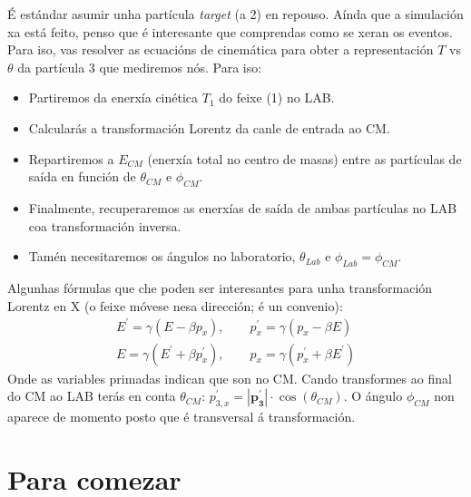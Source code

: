 \documentclass[11pt, a4paper]{article}
\newcommand{\vect}[1]{\boldsymbol{#1}}
\begin{document}
É estándar asumir unha partícula \textit{target} (a 2) en repouso. Aínda que a simulación xa está feito, penso que é interesante que comprendas como se xeran os eventos. Para iso, vas resolver as ecuacións de cinemática para obter a representación $T$ vs $\theta$ da partícula 3 que mediremos nós. Para iso:
\begin{itemize}
    \item Partiremos da enerxía cinética $T_1$ do feixe (1) no LAB.
    \item Calcularás a transformación Lorentz da canle de entrada ao CM.
    \item Repartiremos a $E_{CM}$ (enerxía total no centro de masas) entre as partículas de saída en función de $\theta_{CM}$ e $\phi_{CM}$.
    \item Finalmente, recuperaremos as enerxías de saída de ambas partículas no LAB coa transformación inversa.
    \item Tamén necesitaremos os ángulos no laboratorio, $\theta_{Lab}$ e $\phi_{Lab} = \phi_{CM}$.
\end{itemize}

Algunhas fórmulas que che poden ser interesantes para unha transformación Lorentz en X (o feixe móvese nesa dirección; é un convenio):
\begin{gather*}
    E^{\prime} = \gamma \left(E - \beta p_x\right), \qquad p^{\prime}_{x} = \gamma \left(p_x - \beta E\right)\\
    E = \gamma \left(E^{\prime} + \beta p_{x}^{\prime}\right), \qquad p_x = \gamma \left(p^{\prime}_x + \beta E^{\prime}\right)
\end{gather*}
Onde as variables primadas indican que son no CM. Cando transformes ao final do CM ao LAB terás en conta $\theta_{CM}$: $p_{3,x}^{\prime} = |\vect{p^{\prime}_3}| \cdot\cos(\theta_{CM})$. O ángulo $\phi_{CM}$ non aparece de momento posto que é transversal á transformación.

\section{Para comezar}
\end{document}
